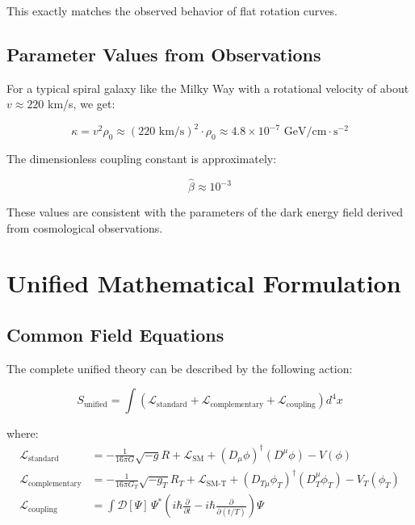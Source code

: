 \documentclass[a4paper,12pt]{article}
\theoremstyle{definition}
\theoremstyle{remark}
\begin{document}
	This exactly matches the observed behavior of flat rotation curves.
	
	\subsection{Parameter Values from Observations}
	
	For a typical spiral galaxy like the Milky Way with a rotational velocity of about $v \approx 220$ km/s, we get:
	
	\begin{equation}
		\kappa = v^2 \rho_0 \approx (220 \text{ km/s})^2 \cdot \rho_0 \approx 4.8 \times 10^{-7} \text{ GeV/cm} \cdot \text{s}^{-2}
	\end{equation}
	
	The dimensionless coupling constant is approximately:
	
	\begin{equation}
		\hat{\beta} \approx 10^{-3}
	\end{equation}
	
	These values are consistent with the parameters of the dark energy field derived from cosmological observations.
	
	\section{Unified Mathematical Formulation}
	
	\subsection{Common Field Equations}
	
	The complete unified theory can be described by the following action:
	
	\begin{equation}
		S_\text{unified} = \int \left( \mathcal{L}_\text{standard} + \mathcal{L}_\text{complementary} + \mathcal{L}_\text{coupling} \right) d^4x
	\end{equation}
	
	where:
	\begin{align}
		\mathcal{L}_\text{standard} &= -\frac{1}{16\pi G} \sqrt{-g} R + \mathcal{L}_\text{SM} + (D_\mu \phi)^\dagger (D^\mu \phi) - V(\phi) \\
		\mathcal{L}_\text{complementary} &= -\frac{1}{16\pi G_T} \sqrt{-g_T} R_T + \mathcal{L}_\text{SM-T} + (D_{T\mu} \phi_T)^\dagger (D_T^\mu \phi_T) - V_T(\phi_T) \\
		\mathcal{L}_\text{coupling} &= \int \mathcal{D}[\Psi] \, \Psi^* \left( i\hbar \frac{\partial}{\partial t} - i\hbar \frac{\partial}{\partial (t/T)} \right) \Psi
	\end{align}
	
\end{document}
